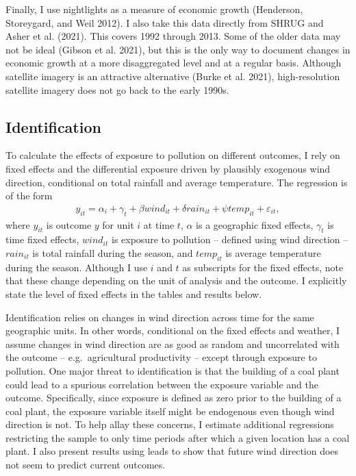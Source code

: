 \documentclass[
]{article}
\begin{document}
Finally, I use nightlights as a measure of economic growth (Henderson, Storeygard, and Weil 2012). I also take this data directly from SHRUG and Asher et al. (2021). This covers 1992 through 2013. Some of the older data may not be ideal (Gibson et al. 2021), but this is the only way to document changes in economic growth at a more disaggregated level and at a regular basis. Although satellite imagery is an attractive alternative (Burke et al. 2021), high-resolution satellite imagery does not go back to the early 1990s.

\hypertarget{identification}{%
\subsection{Identification}\label{identification}}

\label{identification}

To calculate the effects of exposure to pollution on different outcomes, I rely on fixed effects and the differential exposure driven by plausibly exogenous wind direction, conditional on total rainfall and average temperature. The regression is of the form
\begin{gather} y_{it} = \alpha_{i} + \gamma_{t} + \beta wind_{it} + \delta rain_{it} + \psi temp_{it} + \varepsilon_{it}, \end{gather}
where \(y_{it}\) is outcome \(y\) for unit \(i\) at time \(t\), \(\alpha\) is a geographic fixed effects, \(\gamma_t\) is time fixed effects, \(wind_{it}\) is exposure to pollution -- defined using wind direction -- \(rain_{it}\) is total rainfall during the season, and \(temp_{it}\) is average temperature during the season. Although I use \(i\) and \(t\) as subscripts for the fixed effects, note that these change depending on the unit of analysis and the outcome. I explicitly state the level of fixed effects in the tables and results below.

Identification relies on changes in wind direction across time for the same geographic units. In other words, conditional on the fixed effects and weather, I assume changes in wind direction are as good as random and uncorrelated with the outcome -- e.g.~agricultural productivity -- except through exposure to pollution. One major threat to identification is that the building of a coal plant could lead to a spurious correlation between the exposure variable and the outcome. Specifically, since exposure is defined as zero prior to the building of a coal plant, the exposure variable itself might be endogenous even though wind direction is not. To help allay these concerns, I estimate additional regressions restricting the sample to only time periods after which a given location has a coal plant. I also present results using leads to show that future wind direction does not seem to predict current outcomes.
\end{document}
